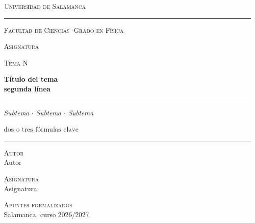 \documentclass[11pt,a4paper,twoside]{article}
\newcommand{\autor}{Autor}
\newcommand{\asignatura}{Asignatura}
\newcommand{\curso}{Salamanca, curso 2026/2027}
\begin{document}
\begin{titlepage}
\centering
{\Large\scshape Universidad de Salamanca\par}
\vspace{0.9cm}
{\color{fg}\rule{\linewidth}{0.4pt}}\par\vspace{0.45cm}
{\small\color{muted}\scshape Facultad de Ciencias \quad$\cdot$\quad Grado en Física\par}
\vspace{1.4cm}
{\color{acc}\scshape \asignatura\par}
\vspace{0.15cm}
{\small\color{muted}\scshape Tema N\par}
\vspace{1.0cm}
{\fontsize{24}{30}\selectfont\bfseries Título del tema\\[2pt] segunda línea\par}
\vspace{0.7cm}
{\color{fg}\rule{0.2\linewidth}{0.4pt}}\par\vspace{0.4cm}
{\small\itshape Subtema $\cdot$ Subtema $\cdot$ Subtema\par}
\vspace{0.8cm}
\vspace{0.5cm}
{\small $\displaystyle \text{dos o tres fórmulas clave}$\par}
\vfill
{\color{fg}\rule{\linewidth}{0.4pt}}\par\vspace{0.3cm}
\begin{minipage}[t]{0.32\linewidth}\raggedright
{\scriptsize\color{acc}\scshape Autor}\\[2pt]{\small\autor}
\end{minipage}\hfill
\begin{minipage}[t]{0.32\linewidth}\centering
{\scriptsize\color{acc}\scshape Asignatura}\\[2pt]{\small\asignatura}
\end{minipage}\hfill
\begin{minipage}[t]{0.32\linewidth}\raggedleft
{\scriptsize\color{acc}\scshape Apuntes formalizados}\\[2pt]{\small\curso}
\end{minipage}
\restoregeometry
\end{titlepage}
\end{document}
